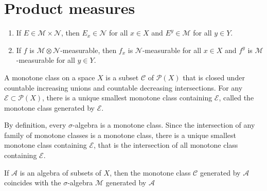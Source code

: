 \section{Product measures}

\begin{proposition}

    \begin{enumerate}
        \item If $E \in \mathcal{M} \times \mathcal{N}$, then $E_x \in \mathcal{N}$ for all $x \in X$ and $E^y \in \mathcal{M}$ for all $y \in Y$.
        \item If $f$ is $\mathcal{M} \otimes \mathcal{N}$-measurable, then $f_x$ is $\mathcal{N}$-measurable for all $x \in X$ and $f^y$ is $\mathcal{M}$-measurable for all $y \in Y$. 
    \end{enumerate}
\end{proposition}

\begin{definition}
    A monotone class on a space $X$ is a subset $\mathcal{C}$ of $\mathcal{P}(X)$ that is closed under countable increasing unions and countable decreasing intersections.
    For any $\mathcal{E} \subset \mathcal{P}(X)$, there is a unique smallest monotone class containing $\mathcal{E}$, called the monotone class generated by $\mathcal{E}$.
\end{definition}

By definition, every $\sigma$-algebra is a monotone class.
Since the intersection of any family of monotone classes is a monotone class, there is a unique smallest monotone class containing $\mathcal{E}$, that is the intersection of all monotone class containing $\mathcal{E}$.

\begin{lemma}
    If $\mathcal{A}$ is an algebra of subsets of $X$, then the monotone class $\mathcal{C}$ generated by $\mathcal{A}$ coincides with the $\sigma$-algebra $\mathcal{M}$ generated by $\mathcal{A}$
\end{lemma}

\begin{theorem}
    
\end{theorem}

